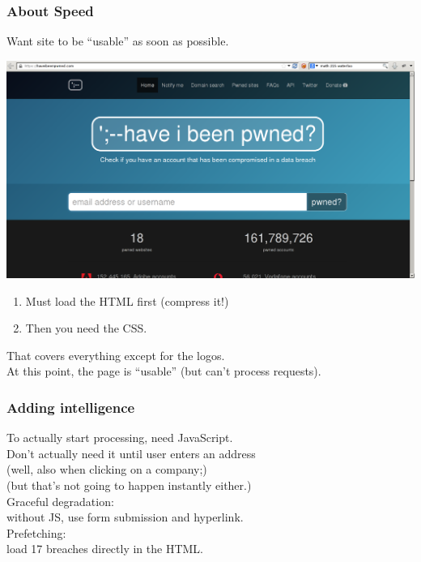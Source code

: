 \documentclass[aspectratio=43]{beamer}
\newenvironment{changemargin}[1]{%
  \begin{list}{}{%
    \setlength{\topsep}{0pt}%
    \setlength{\leftmargin}{#1}%
    \setlength{\rightmargin}{1em}
    \setlength{\listparindent}{\parindent}%
    \setlength{\itemindent}{\parindent}%
    \setlength{\parsep}{\parskip}%
  }%
  \item[]}{\end{list}}
\begin{document}
\begin{frame}
  \frametitle{About Speed}

  \begin{changemargin}{1.5cm}
    Want site to be ``usable'' as soon as possible.
      \begin{center}
    \includegraphics[width=.5\textwidth]{L22/haveibeenpwned.png}
      \end{center}
      \begin{enumerate}
      \item Must load the HTML first (compress it!)
      \item Then you need the CSS.
      \end{enumerate}
      That covers everything except for the logos.\\[1em]
      At this point, the page is ``usable'' (but can't process requests).

  \end{changemargin}
  
\end{frame}

\begin{frame}
  \frametitle{Adding intelligence}

  \begin{changemargin}{2cm}
    To actually start processing, need JavaScript.\\[1em]
    Don't actually need it until user enters an address\\
    \hspace*{1em} (well, also when clicking on a company;)\\
    \hspace*{1em} (but that's not going to happen instantly either.)\\[1em]
    Graceful degradation: \\
    \hspace*{1em} without JS, use form submission and hyperlink.\\[1em]
    Prefetching: \\
    \hspace*{1em} load 17 breaches directly in the HTML.
  \end{changemargin}
  
\end{frame}
\end{document}
